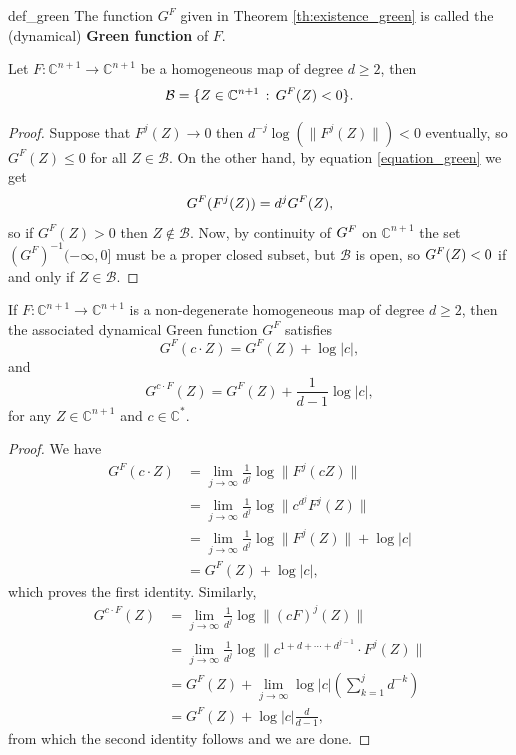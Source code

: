 \begin{mydef}{}{def_green}
The function $G^F$ given in Theorem \ref{th:existence_green} is called the (dynamical) {\bf Green function} of $F$.
\end{mydef}

\begin{mytheo}{}{}
Let $F:\mathbb{C}^{n+1} \rightarrow \mathbb{C}^{n+1}$ be a homogeneous map of degree $d\geq 2$, then
$$\mathcal{B} = \{Z \in \mathbb{C}^{n+1} \,:\, G^F (Z) < 0\}.$$
\end{mytheo}

\begin{proof}
Suppose that $F^j(Z) \rightarrow 0$ then $d^{-j}\log (\|F^j(Z)\|)<0$ eventually, so $G^F(Z)\leq 0$ for all $Z\in \mathcal{B}$. On the other hand, by equation \eqref{equation_green} we get
$$G^F (F^j(Z)) = d^j G^F(Z),$$
so if $G^F(Z)>0$ then $Z\not \in \mathcal{B}$. Now, by continuity of $G^F$ on $\mathbb{C}^{n+1}$ the set $(G^F)^{-1}(-\infty,0]$ must be a proper closed subset, but $\mathcal{B}$ is open, so $G^F (Z)<0$ if and only if $Z\in \mathcal{B}$.
\end{proof}

\begin{myprop}{}{}
If $F:\mathbb{C}^{n+1} \rightarrow \mathbb{C}^{n+1}$ is a non-degenerate homogeneous map of degree $d\geq 2$, then the associated dynamical Green function $G^F$ satisfies
\begin{equation}\label{equgreen01}
G^F(c\cdot Z) = G^F(Z) + \log|c|,
\end{equation}
and
\begin{equation}\label{equgreen02}
G^{c\cdot F}(Z) = G^F(Z) + \frac{1}{d-1}\log|c|,
\end{equation}
for any $Z\in \mathbb{C}^{n+1}$ and $c\in \mathbb{C}^*$.
\end{myprop}

\begin{proof}
We have
\begin{align*}
G^F(c\cdot Z) &= \lim_{j\rightarrow \infty} \frac{1}{d^j} \log\| F^j(cZ)\| \\
&=  \lim_{j\rightarrow \infty} \frac{1}{d^j} \log\| c^{d^j}F^j(Z)\|\\
&= \lim_{j\rightarrow \infty} \frac{1}{d^j}\log\|F^j(Z)\| + \log|c|\\
&= G^F(Z) + \log|c|,
\end{align*}
which proves the first identity. Similarly,
\begin{align*}
G^{c\cdot F}(Z) &= \lim_{j\rightarrow \infty} \frac{1}{d^j} \log\| (cF)^j(Z)\| \\
&= \lim_{j\rightarrow \infty} \frac{1}{d^j} \log\| c^{1+d+\cdots+d^{j-1}}\cdot F^j(Z)\| \\
&= G^F(Z) + \lim_{j\rightarrow \infty} \log|c|(\sum_{k=1}^{j} d^{-k})\\
&= G^F(Z) + \log|c|\frac{d}{d-1},
\end{align*}
from which the second identity follows and we are done.
\end{proof}

